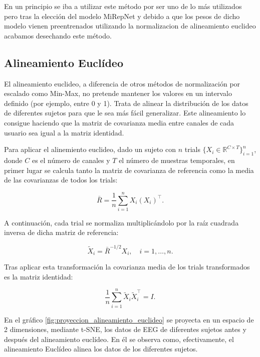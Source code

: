 En un principio se iba a utilizar este método por ser uno de lo más utilizados pero tras la elección del modelo MiRepNet y debido a que los pesos de dicho modelo vienen preentrenados utilizando la normalizacion de alineamiento euclideo acabamos desechando este método.

\subsection{Alineamiento Euclídeo}
\label{subsec:alineamiento_euclideon}

El alineamiento euclideo, a diferencia de otros métodos de normalización por escalado como Min-Max, no pretende mantener los valores en un intervalo definido (por ejemplo, entre 0 y 1). 
Trata de alinear la distribución de los datos de diferentes sujetos para que le sea más fácil generalizar. Este alineamiento lo consigue haciendo que la matriz de covarianza media entre canales de cada usuario sea igual a la matriz identidad.

Para aplicar el alinemiento euclideo, dado un sujeto con $n$ trials $\{X_i \in \mathbb{R}^{C \times T}\}_{i=1}^{n}$, donde $C$ es el número de canales y $T$ el número de muestras temporales, en primer lugar se calcula tanto la matriz de covarianza de referencia como la media de las covarianzas de todos los trials:

\begin{equation}
    \bar{R} = \frac{1}{n} \sum_{i=1}^{n} X_i(X_i)^\top.
\end{equation}

A continuación, cada trial se normaliza multiplicándolo por la raíz cuadrada inversa de dicha matriz de referencia:

\begin{equation}
    \tilde{X}_i = \bar{R}^{-1/2} X_i, \quad i = 1, \ldots, n.
\end{equation}

Tras aplicar esta transformación la covarianza media de los trials transformados es la matriz identidad:

\begin{equation}
    \frac{1}{n} \sum_{i=1}^{n} \tilde{X}_i \tilde{X}_i^\top = I.
\end{equation}

En el gráfico \ref{fig:proyeccion_alineamiento_euclideo} se proyecta en un espacio de 2 dimensiones, mediante t-SNE, los datos de EEG de diferentes sujetos antes y después del alineamiento euclídeo. En él se observa como, efectivamente, el alineamiento Euclídeo alinea los datos de los diferentes sujetos.


